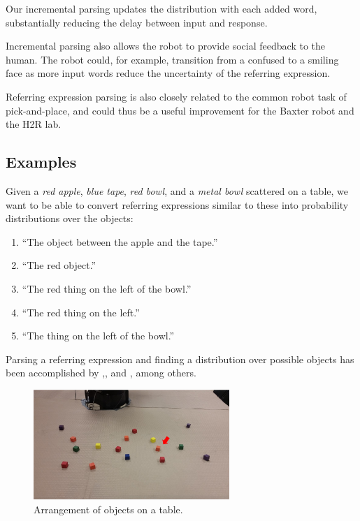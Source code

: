 \documentclass[letterpaper,10pt]{article}
\begin{document}
Our incremental parsing updates the distribution with each added word, substantially reducing the delay between input and response.

Incremental parsing also allows the robot to provide social feedback to the human. The robot could, for example, transition from a confused to a smiling face as more input words reduce the uncertainty of the referring expression.

Referring expression parsing is also closely related to the common robot task of pick-and-place, and could thus be a useful improvement for the Baxter robot and the H2R lab. 


\subsection{Examples}
Given a \textit{red apple}, \textit{blue tape}, \textit{red bowl}, and a \textit{metal bowl} scattered on a table, we want to be able to convert referring expressions similar to these into probability distributions over the objects:
\begin{enumerate}[topsep=0pt,itemsep=-1ex,partopsep=1ex,parsep=1ex]
 \item ``The object between the apple and the tape.''
 \item ``The red object.''
 \item ``The red thing on the left of the bowl.''
 \item ``The red thing on the left.''
 \item ``The thing on the left of the bowl.''
\end{enumerate}
Parsing a referring expression and finding a distribution over possible objects has been accomplished by \citet{tellex2011understanding},\citet{UW_RSE_ICML2012}, and \citet{artzi2013weakly}, among others.

\begin{figure}[h!tb]
  \centering
    \includegraphics[width=0.66\textwidth]{worked_example_scene}
  \caption{Arrangement of objects on a table.}
  \label{fig:worked_example_table}
\end{figure}
\end{document}
